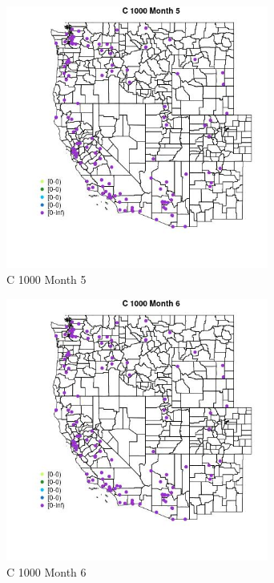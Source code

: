 \begin{figure} 
\centering  
\includegraphics[width=0.77\textwidth]{Code_Outputs/Report_ML_input_PM25_Step4_part_e_de_duplicated_aves_MapObsMo5C_1000.jpg} 
\caption{\label{fig:Report_ML_input_PM25_Step4_part_e_de_duplicated_avesMapObsMo5C_1000}C 1000 Month 5} 
\end{figure} 
 

\begin{figure} 
\centering  
\includegraphics[width=0.77\textwidth]{Code_Outputs/Report_ML_input_PM25_Step4_part_e_de_duplicated_aves_MapObsMo6C_1000.jpg} 
\caption{\label{fig:Report_ML_input_PM25_Step4_part_e_de_duplicated_avesMapObsMo6C_1000}C 1000 Month 6} 
\end{figure} 
 

